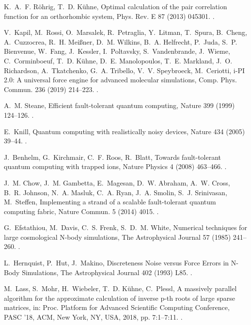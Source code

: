 \documentclass[preprint]{elsarticle}
\begin{document}
\begin{thebibliography}{10}
K.~A.~F. R\"ohrig, T.~D. K\"uhne, Optimal calculation of the pair correlation
  function for an orthorhombic system, Phys. Rev. E 87 (2013) 045301.
\newblock \href {https://doi.org/10.1103/PhysRevE.87.045301}
  {}.

V.~Kapil, M.~Rossi, O.~Marsalek, R.~Petraglia, Y.~Litman, T.~Spura, B.~Cheng,
  A.~Cuzzocrea, R.~H. Mei{\ss}ner, D.~M. Wilkins, B.~A. Helfrecht, P.~Juda,
  S.~P. Bienvenue, W.~Fang, J.~Kessler, I.~Poltavsky, S.~Vandenbrande,
  J.~Wieme, C.~Corminboeuf, T.~D. K{\"u}hne, D.~E. Manolopoulos, T.~E.
  Markland, J.~O. Richardson, A.~Tkatchenko, G.~A. Tribello, V.~V. Speybroeck,
  M.~Ceriotti, {i-PI} 2.0: A universal force engine for advanced molecular
  simulations, Comp. Phys. Commun. 236 (2019) 214--223.
\newblock \href {https://doi.org/10.1016/j.cpc.2018.09.020}
  {}.

A.~M. Steane, Efficient fault-tolerant quantum computing, Nature 399 (1999)
  124--126.
\newblock \href {https://doi.org/10.1038/20127} {}.

E.~Knill, Quantum computing with realistically noisy devices, Nature 434 (2005)
  39--44.
\newblock \href {https://doi.org/10.1038/nature03350}
  {}.

J.~Benhelm, G.~Kirchmair, C.~F. Roos, R.~Blatt, Towards fault-tolerant quantum
  computing with trapped ions, Nature Physics 4 (2008) 463--466.
\newblock \href {https://doi.org/10.1038/nphys961}
  {}.

J.~M. Chow, J.~M. Gambetta, E.~Magesan, D.~W. Abraham, A.~W. Cross, B.~R.
  Johnson, N.~A. Masluk, C.~A. Ryan, J.~A. Smolin, S.~J. Srinivasan,
  M.~Steffen, Implementing a strand of a scalable fault-tolerant quantum
  computing fabric, Nature Commun. 5 (2014) 4015.
\newblock \href {https://doi.org/10.1038/ncomms5015}
  {}.

G.~{Efstathiou}, M.~{Davis}, C.~S. {Frenk}, S.~D.~M. {White}, {Numerical
  techniques for large cosmological N-body simulations}, The Astrophysical
  Journal 57 (1985) 241--260.
\newblock \href {https://doi.org/10.1086/191003} {}.

L.~{Hernquist}, P.~{Hut}, J.~{Makino}, {Discreteness Noise versus Force Errors
  in N-Body Simulations}, The Astrophysical Journal 402 (1993) L85.
\newblock \href {https://doi.org/10.1086/186706} {}.

M.~Lass, S.~Mohr, H.~Wiebeler, T.~D. K\"{u}hne, C.~Plessl, A massively parallel
  algorithm for the approximate calculation of inverse p-th roots of large
  sparse matrices, in: Proc. Platform for Advanced Scientific Computing
  Conference, PASC '18, ACM, New York, NY, USA, 2018, pp. 7:1--7:11.
\newblock \href {https://doi.org/10.1145/3218176.3218231}
  {}.

\end{thebibliography}
\end{document}
